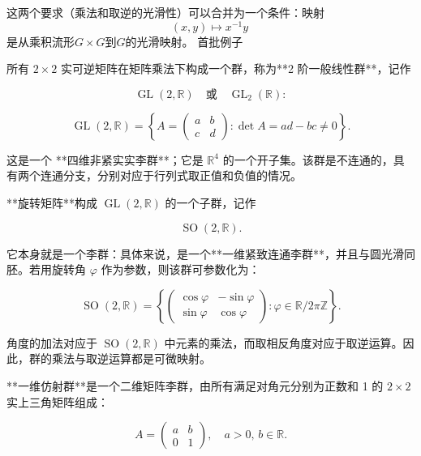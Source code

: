 这两个要求（乘法和取逆的光滑性）可以合并为一个条件：映射
$$
(x,y) \mapsto x^{-1}y~
$$
是从乘积流形$G \times G$到$G$的光滑映射。
首批例子

所有 $2 \times 2$ 实可逆矩阵在矩阵乘法下构成一个群，称为**2 阶一般线性群**，记作

$$
\operatorname{GL}(2,\mathbb{R}) \quad \text{或} \quad \operatorname{GL}_{2}(\mathbb{R}) :
$$

$$
\operatorname{GL}(2,\mathbb{R})=\left\{A=\begin{pmatrix}a & b \\ c & d\end{pmatrix} : \det A = ad - bc \neq 0 \right\}.
$$

这是一个 **四维非紧实实李群**；它是 $\mathbb{R}^4$ 的一个开子集。该群是不连通的，具有两个连通分支，分别对应于行列式取正值和负值的情况。

**旋转矩阵**构成 $\operatorname{GL}(2,\mathbb{R})$ 的一个子群，记作

$$
\operatorname{SO}(2,\mathbb{R}).
$$

它本身就是一个李群：具体来说，是一个**一维紧致连通李群**，并且与圆光滑同胚。若用旋转角 $\varphi$ 作为参数，则该群可参数化为：

$$
\operatorname{SO}(2,\mathbb{R})=\left\{\begin{pmatrix}\cos \varphi & -\sin \varphi \\ \sin \varphi & \cos \varphi \end{pmatrix} : \varphi \in \mathbb{R} / 2\pi\mathbb{Z}\right\}.
$$

角度的加法对应于 $\operatorname{SO}(2,\mathbb{R})$ 中元素的乘法，而取相反角度对应于取逆运算。因此，群的乘法与取逆运算都是可微映射。

**一维仿射群**是一个二维矩阵李群，由所有满足对角元分别为正数和 1 的 $2 \times 2$ 实上三角矩阵组成：

$$
A=\begin{pmatrix} a & b \\ 0 & 1 \end{pmatrix}, \quad a > 0, \, b \in \mathbb{R}.
$$
